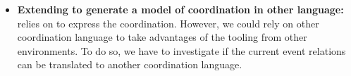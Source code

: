 \begin{itemize}
	\item \textbf{Extending \bcool to generate a model of coordination in other language:} \bcool relies on \ccsl to express the coordination. However, we could rely on other coordination language to take advantages of the tooling from other environments. To do so, we have to investigate if the current event relations can be translated to another coordination language.
\end{itemize}
